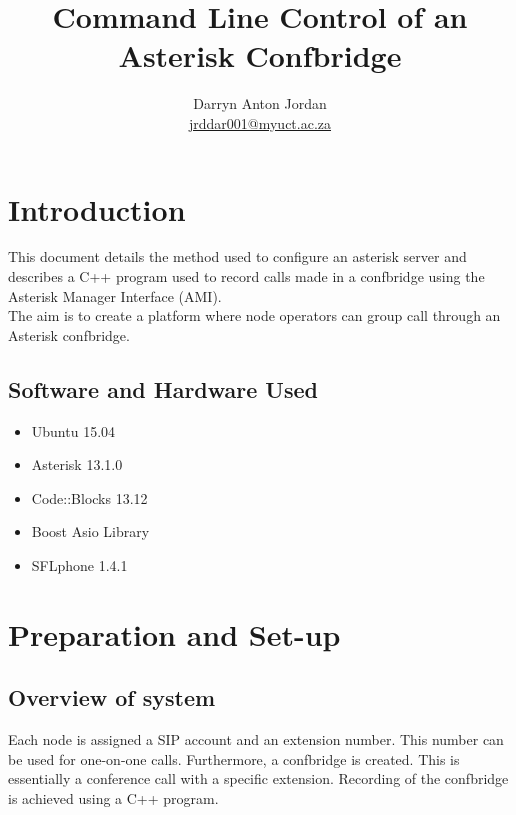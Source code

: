 \documentclass[a4paper,11pt]{report}
\title{Command Line Control of an Asterisk Confbridge}
\author{Darryn Anton Jordan \\\href{mailto:jrddar001@myuct.ac.za}{jrddar001@myuct.ac.za}}
\begin{document}
\maketitle
\tableofcontents


\newpage

\section{Introduction}
This document details the method used to configure an asterisk server and describes a C++ program used to record calls made in a confbridge using the Asterisk Manager Interface (AMI).\\ The aim is to create a platform where node operators can group call through an Asterisk confbridge. 

\subsection{Software and Hardware Used}
\begin{itemize}
  \item Ubuntu 15.04
  \item Asterisk 13.1.0
  \item Code::Blocks 13.12
  \item Boost Asio Library
  \item SFLphone 1.4.1
\end{itemize}

\newpage

\section{Preparation and Set-up}
\subsection{Overview of system}
Each node is assigned a SIP account and an extension number. This number can be used for one-on-one calls. Furthermore, a confbridge is created. This is essentially a conference call with a specific extension. Recording of the confbridge is achieved using a C++ program. 
\end{document}
